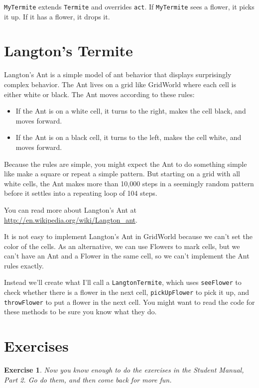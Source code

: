 \documentclass[12pt]{book}
\theoremstyle{exercise}
\newtheorem{exercise}{Exercise}[chapter]
\begin{document}
{\tt MyTermite} extends {\tt Termite} and overrides {\tt act}.
If {\tt MyTermite} sees a flower, it picks it up.  If it has
a flower, it drops it.


\section{Langton's Termite}

Langton's Ant is a simple model of ant behavior that
displays surprisingly complex behavior.  The Ant lives on a grid
like GridWorld where each cell is either white or black.  The
Ant moves according to these rules:

\begin{itemize}

\item If the Ant is on a white cell, it turns to the right,
makes the cell black, and moves forward.

\item If the Ant is on a black cell, it turns to the left,
makes the cell white, and moves forward.

\end{itemize}

Because the rules are simple, you might expect the Ant to do
something simple like make a square or repeat a simple
pattern.  But starting on a grid with all white cells, the
Ant makes more than 10,000 steps in a seemingly random pattern
before it settles into a repeating loop of 104 steps.

You can read more about Langton's
Ant at \url{http://en.wikipedia.org/wiki/Langton_ant}.

It is not easy to implement
Langton's Ant in GridWorld because we can't set the color of
the cells.  As an alternative, we can use Flowers to mark
cells, but we can't have an Ant and a Flower in the same cell,
so we can't implement the Ant rules exactly.

Instead we'll create what I'll call a {\tt LangtonTermite}, which uses
{\tt seeFlower} to check whether there is a flower in the next cell,
{\tt pickUpFlower} to pick it up,
and {\tt throwFlower} to put a flower in the next cell.  You
might want to read the code for these methods to be sure you
know what they do.

\section{Exercises}

\begin{exercise}
Now you know enough to do the exercises in the Student Manual, Part 2.
Go do them, and then come back for more fun.
\end{exercise}
\end{document}
